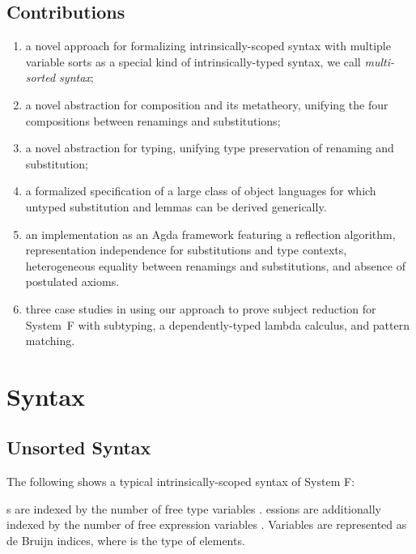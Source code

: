 \documentclass[a4paper, UKenglish, cleveref, autoref, thm-restate]{lipics-v2021}
\newenvironment{ExampleCode*}{%
  \begin{tcolorbox}[%
    colframe=white,%
    colback=yellow!5,%
    boxrule=0.0pt,%
    top=2.5pt,%
    left=2.5pt,%
    bottom=2.5pt,%
    right=2.5pt,%
    before skip=5pt,%
    after skip=5pt,%
    boxsep=0pt%
  ]\vspace{-0.2\baselineskip}%
}{%
  \vspace{-1\baselineskip}%
  \end{tcolorbox}%
}
\newcommand*\ExampleCode[1]{\begin{ExampleCode*}{#1}\end{ExampleCode*}}
\newcommand*\ACode[1]{\AgdaFontStyle{\textcolor{mygray}{#1}}}
\newcommand*\ACon[1]{\AgdaInductiveConstructor{#1}}
\begin{document}
  \subsection{Contributions}
  \label{sec:introduction:contributions}
  \begin{enumerate}
  \item
    a novel approach for formalizing intrinsically-scoped syntax with
    multiple variable sorts as a special kind of intrinsically-typed
    syntax, we call \emph{multi-sorted syntax};
  \item
    a novel abstraction for composition and its metatheory, unifying
    the four compositions between renamings and substitutions;
  \item
    a novel abstraction for typing, unifying type
    preservation of renaming and substitution;
  \item
    a formalized specification of a large class of object languages
    for which untyped substitution and lemmas can be derived generically.
  \item
    an implementation as an Agda framework featuring
    a reflection algorithm, representation independence for
    substitutions and type contexts, heterogeneous equality between
    renamings and substitutions, and absence of postulated axioms.
  \item
    three case studies in using our approach to prove subject reduction
    for System~F with subtyping, a dependently-typed lambda calculus, and
    pattern matching.
  \end{enumerate}

  \section{Syntax}
  \label{sec:syntax}
  \subsection{Unsorted Syntax}
  \label{sec:syntax:single}
  The following shows a typical intrinsically-scoped syntax of System F:
  \ExampleCode\FUnsortedSyntax

  \ACode{\ACon{Type}}s are indexed by the number of free type
  variables \ACode{n}.
  \ACode{\ACon{Expr}}essions are additionally indexed by the number of
  free expression variables \ACode{m}.
  Variables \ACode{\ACon{`\_}} are represented as de Bruijn indices, where
  \ACode{\ACon{Fin} n} is the type of \ACode{n} elements.
\end{document}

